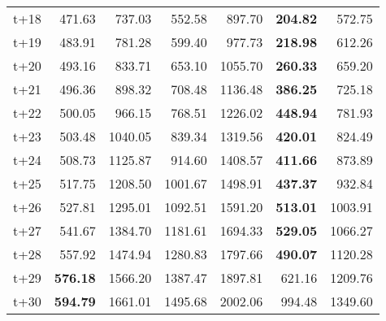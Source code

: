\begin{table}[H]
\begin{tabular}{lrrrrrr}
t+18  & 471.63  & 737.03  & 552.58  & 897.70  & \textbf{204.82}  & 572.75  \\
t+19  & 483.91  & 781.28  & 599.40  & 977.73  & \textbf{218.98}  & 612.26  \\
t+20  & 493.16  & 833.71  & 653.10  & 1055.70  & \textbf{260.33}  & 659.20  \\
t+21  & 496.36  & 898.32  & 708.48  & 1136.48  & \textbf{386.25}  & 725.18  \\
t+22  & 500.05  & 966.15  & 768.51  & 1226.02  & \textbf{448.94}  & 781.93  \\
t+23  & 503.48  & 1040.05  & 839.34  & 1319.56  & \textbf{420.01}  & 824.49  \\
t+24  & 508.73  & 1125.87  & 914.60  & 1408.57  & \textbf{411.66}  & 873.89  \\
t+25  & 517.75  & 1208.50  & 1001.67  & 1498.91  & \textbf{437.37}  & 932.84  \\
t+26  & 527.81  & 1295.01  & 1092.51  & 1591.20  & \textbf{513.01}  & 1003.91  \\
t+27  & 541.67  & 1384.70  & 1181.61  & 1694.33  & \textbf{529.05}  & 1066.27  \\
t+28  & 557.92  & 1474.94  & 1280.83  & 1797.66  & \textbf{490.07}  & 1120.28  \\
t+29  & \textbf{576.18}  & 1566.20  & 1387.47  & 1897.81  & 621.16  & 1209.76  \\
t+30  & \textbf{594.79}  & 1661.01  & 1495.68  & 2002.06  & 994.48  & 1349.60  \\

\bottomrule
\end{tabular}
\end{table}
